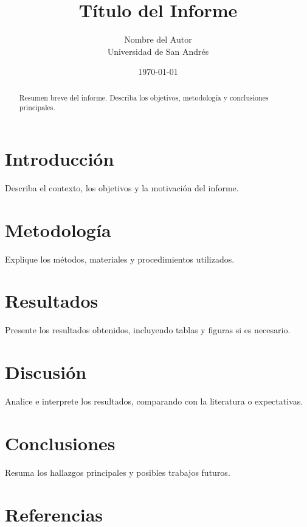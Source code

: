 \documentclass[a4paper,12pt]{article}
\title{Título del Informe}
\author{Nombre del Autor \\ Universidad de San Andrés}
\date{\today}
\begin{document}
\maketitle

\begin{abstract}
Resumen breve del informe. Describa los objetivos, metodología y conclusiones principales.
\end{abstract}

\section{Introducción}
Describa el contexto, los objetivos y la motivación del informe.

\section{Metodología}
Explique los métodos, materiales y procedimientos utilizados.

\section{Resultados}
Presente los resultados obtenidos, incluyendo tablas y figuras si es necesario.

\section{Discusión}
Analice e interprete los resultados, comparando con la literatura o expectativas.

\section{Conclusiones}
Resuma los hallazgos principales y posibles trabajos futuros.

\section*{Referencias}


\end{document}
